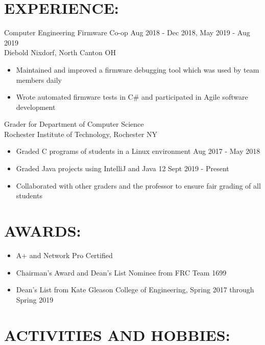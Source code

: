 \documentclass[line,margin]{res}
\begin{document}
\begin{resume}
	\section{EXPERIENCE:}

		Computer Engineering Firmware Co-op \hfill Aug 2018 - Dec 2018, May 2019 - Aug 2019\\
		Diebold Nixdorf, North Canton OH
		\begin{itemize}
			\item Maintained and improved a firmware debugging tool which was used by team members daily
			\item Wrote automated firmware tests in C\# and participated in Agile software development
		\end{itemize}
		\vspace{-8pt}

		Grader for Department of Computer Science\\
		Rochester Institute of Technology, Rochester NY
		\begin{itemize}
			\item Graded C programs of students in a Linux environment \hfill Aug 2017 - May 2018
			\item Graded Java projects using IntelliJ and Java 12 \hfill Sept 2019 - Present
			\item Collaborated with other graders and the professor to ensure fair grading of all students
		\end{itemize}

	\section{AWARDS:}
		\begin{itemize}
			\setlength{\itemindent}{-15pt}
			\item A+ and Network Pro Certified
			\item Chairman's Award and Dean's List Nominee from FRC Team 1699
			\item Dean's List from Kate Gleason College of Engineering, Spring 2017 through Spring 2019
		\end{itemize}

	\section{ACTIVITIES AND HOBBIES:}


\end{resume}
\end{document}
